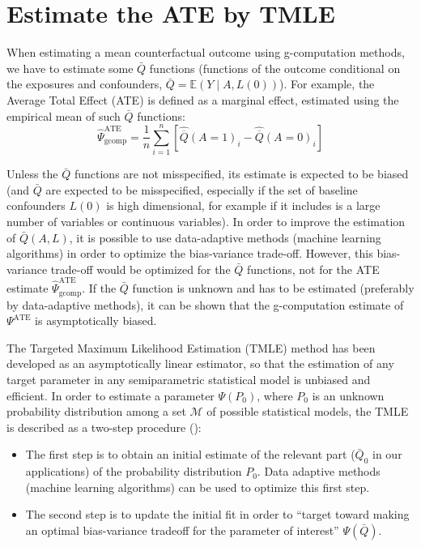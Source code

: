 \documentclass[
]{book}
\providecommand{\tightlist}{%
  \setlength{\itemsep}{0pt}\setlength{\parskip}{0pt}}
\begin{document}
\chapter{Estimate the ATE by TMLE}\label{estimate-the-ate-by-tmle}

When estimating a mean counterfactual outcome using g-computation methods, we have to estimate some \(\bar{Q}\) functions (functions of the outcome conditional on the exposures and confounders, \(\bar{Q}=\mathbb{E}\left(Y\mid A,L(0)\right)\)). For example, the Average Total Effect (ATE) is defined as a marginal effect, estimated using the empirical mean of such \(\bar{Q}\) functions:
\begin{equation*}
\hat{\Psi}^{\text{ATE}}_{\text{gcomp}} = \frac{1}{n} \sum_{i=1}^n \left[ \hat{\overline{Q}}(A=1)_i - \hat{\overline{Q}}(A=0)_i \right]
\end{equation*}

Unless the \(\bar{Q}\) functions are not misspecified, its estimate is expected to be biased (and \(\bar{Q}\) are expected to be misspecified, especially if the set of baseline confounders \(L(0)\) is high dimensional, for example if it includes is a large number of variables or continuous variables). In order to improve the estimation of \(\bar{Q}(A,L)\), it is possible to use data-adaptive methods (machine learning algorithms) in order to optimize the bias-variance trade-off. However, this bias-variance trade-off would be optimized for the \(\bar{Q}\) functions, not for the ATE estimate \(\hat{\Psi}^\text{ATE}_\text{gcomp}\). If the \(\bar{Q}\) function is unknown and has to be estimated (preferably by data-adaptive methods), it can be shown that the g-computation estimate of \(\Psi^\text{ATE}\) is asymptotically biased.

The Targeted Maximum Likelihood Estimation (TMLE) method has been developed as an asymptotically linear estimator, so that the estimation of any target parameter in any semiparametric statistical model is unbiased and efficient. In order to estimate a parameter \(\Psi(P_0)\), where \(P_0\) is an unknown probability distribution among a set \(\mathcal{M}\) of possible statistical models, the TMLE is described as a two-step procedure ():

\begin{itemize}
\tightlist
\item
  The first step is to obtain an initial estimate of the relevant part (\(\bar{Q}_0\) in our applications) of the probability distribution \(P_0\). Data adaptive methods (machine learning algorithms) can be used to optimize this first step.
\item
  The second step is to update the initial fit in order to ``target toward making an optimal bias-variance tradeoff for the parameter of interest'' \(\Psi(\bar{Q})\).
\end{itemize}
\end{document}
